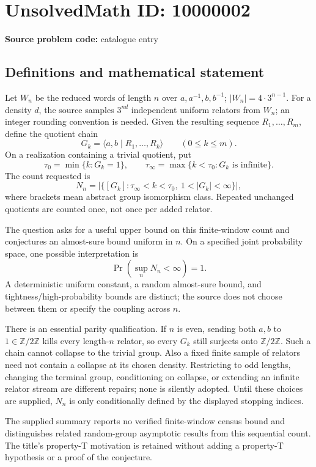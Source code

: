 \documentclass[11pt]{article}
\newcommand{\Z}{\mathbb{Z}}
\begin{document}
\section*{UnsolvedMath ID: 10000002}
\textbf{Source problem code:} catalogue entry
\subsection{Definitions and mathematical statement}
Let \(W_n\) be the reduced words of length \(n\) over \(a,a^{-1},b,b^{-1}\); \(|W_n|=4\cdot3^{n-1}\). For a density \(d\), the source samples \(3^{nd}\) independent uniform relators from \(W_n\); an integer rounding convention is needed. Given the resulting sequence \(R_1,\ldots,R_m\), define the quotient chain
\[
G_k=\langle a,b\mid R_1,\ldots,R_k\rangle\qquad(0\le k\le m).
\]
On a realization containing a trivial quotient, put
\[
\tau_0=\min\{k:G_k=1\},\qquad
\tau_\infty=\max\{k<\tau_0:G_k\text{ is infinite}\}.
\]
The count requested is
\[
N_n=\left|\{[G_k]:\tau_\infty<k<\tau_0,\
1<|G_k|<\infty\}\right|,
\]
where brackets mean abstract group isomorphism class. Repeated unchanged quotients are counted once, not once per added relator.

The question asks for a useful upper bound on this finite-window count and conjectures an almost-sure bound uniform in \(n\). On a specified joint probability space, one possible interpretation is
\[
\Pr\!\left(\sup_nN_n<\infty\right)=1.
\]
A deterministic uniform constant, a random almost-sure bound, and tightness/high-probability bounds are distinct; the source does not choose between them or specify the coupling across \(n\).

There is an essential parity qualification. If \(n\) is even, sending both \(a,b\) to \(1\in\Z/2\Z\) kills every length-\(n\) relator, so every \(G_k\) still surjects onto \(\Z/2\Z\). Such a chain cannot collapse to the trivial group. Also a fixed finite sample of relators need not contain a collapse at its chosen density. Restricting to odd lengths, changing the terminal group, conditioning on collapse, or extending an infinite relator stream are different repairs; none is silently adopted. Until these choices are supplied, \(N_n\) is only conditionally defined by the displayed stopping indices.

The supplied summary reports no verified finite-window census bound and distinguishes related random-group asymptotic results from this sequential count. The title's property-T motivation is retained without adding a property-T hypothesis or a proof of the conjecture.
\end{document}
